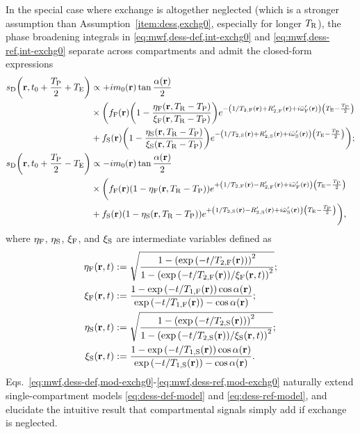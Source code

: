 In the special case
where exchange is altogether neglected
(which is a stronger assumption
than Assumption~\ref{item:dess,exchg0},
especially for longer $T_\mathrm{R}$),
the phase broadening integrals 
in \eqref{eq:mwf,dess-def,int-exchg0} and \eqref{eq:mwf,dess-ref,int-exchg0}
separate across compartments
and admit the closed-form expressions
\begin{align}
	\dess\paren{\bmr,t_0+\frac{\TP}{2}+\TE} &\propto
		+i\mzero\pr \tan{\frac{\flip\pr}{2}} 
		\label{eq:mwf,dess-def,mod-exchg0} \\
	&\times 
		\bigg(
			\ff\pr \paren{1-\frac{\etaf\paren{\bmr,\TR-\TP}}{\xif\paren{\bmr,\TR-\TP}}}
			e^{-\paren{1/\tf{2}\pr+\Rtpf\pr+i\ompfmed\pr}\paren{\TE-\frac{\TP}{2}}}
			\nonumber \\
	&+	
			\fs\pr \paren{1-\frac{\etas\paren{\bmr,\TR-\TP}}{\xis\paren{\bmr,\TR-\TP}}}
			e^{-\paren{1/\ts{2}\pr+\Rtps\pr+i\ompsmed\pr}\paren{\TE-\frac{\TP}{2}}}
		\bigg);
		\nonumber \\
	\dess\paren{\bmr,t_0+\frac{\TP}{2}-\TE} &\propto
		-i\mzero\pr \tan{\frac{\flip\pr}{2}}
		\label{eq:mwf,dess-ref,mod-exchg0} \\
	&\times
		\bigg(
			\ff\pr \paren{1-\etaf\paren{\bmr,\TR-\TP}}
			e^{+\paren{1/\tf{2}\pr-\Rtpf\pr+i\ompfmed\pr}\paren{\TE-\frac{\TP}{2}}}
			\nonumber \\
	&+
			\fs\pr \paren{1-\etas\paren{\bmr,\TR-\TP}}
			e^{+\paren{1/\ts{2}\pr-\Rtps\pr+i\ompsmed\pr}\paren{\TE-\frac{\TP}{2}}}
		\bigg),
		\nonumber
\end{align}
where $\eta_{\mathrm{F}}$, $\eta_{\mathrm{S}}$, $\xi_{\mathrm{F}}$, and $\xi_{\mathrm{S}}$ 
are intermediate variables defined as
\begin{align}
	\etaf\prt &:=
		\sqrt{\frac{1-\paren{\expa{-t/\tf{2}\pr}}^2}
		{1-\paren{\expa{-t/\tf{2}\pr}/\xif\prt}^2}};
		\nonumber \\
	\xif\prt &:=
		\frac{1-\expa{-t/\tf{1}\pr}\cos{\flip\pr}}
		{\expa{-t/\tf{1}\pr}-\cos{\flip\pr}};
		\nonumber \\
	\etas\prt &:=
		\sqrt{\frac{1-\paren{\expa{-t/\ts{2}\pr}}^2}
		{1-\paren{\expa{-t/\ts{2}\pr}/\xis\prt}^2}};
		\nonumber \\
	\xis\prt &:=
		\frac{1-\expa{-t/\ts{1}\pr}\cos{\flip\pr}}
		{\expa{-t/\ts{1}\pr}-\cos{\flip\pr}}.
		\nonumber
\end{align}
Eqs.~\eqref{eq:mwf,dess-def,mod-exchg0}-\eqref{eq:mwf,dess-ref,mod-exchg0}
naturally extend single-compartment models
\eqref{eq:dess-def-model} and \eqref{eq:dess-ref-model},
and elucidate the intuitive result
that compartmental signals simply add
if exchange is neglected.

